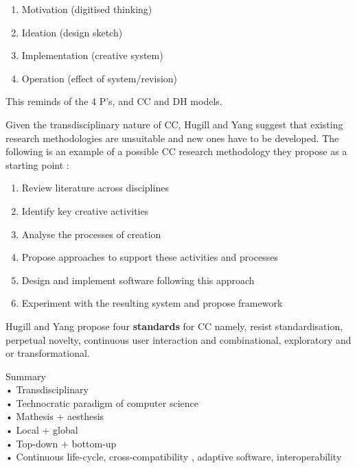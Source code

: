 \begin{enumerate}
  \item Motivation (digitised thinking)
  \item Ideation (design sketch)
  \item Implementation (creative system)
  \item Operation (effect of system/revision)
\end{enumerate}

\begin{draft}
  This reminds of the 4 P’s, and CC and DH models.
\end{draft}

Given the transdisciplinary nature of CC, Hugill and Yang suggest that existing research methodologies are unsuitable and new ones have to be developed. The following is an example of a possible CC research methodology they propose as a starting point \citep[p.17]{Hugill2013c}:

\begin{enumerate}
  \item Review literature across disciplines
  \item Identify key creative activities
  \item Analyse the processes of creation
  \item Propose approaches to support these activities and processes
  \item Design and implement software following this approach
  \item Experiment with the resulting system and propose framework
\end{enumerate}

Hugill and Yang propose four \textbf{standards} for CC \citep[p.17]{Hugill2013c} namely, resist standardisation, perpetual novelty, continuous user interaction and combinational, exploratory and or transformational.

\begin{shaded}
  Summary\\
  •	Transdisciplinary\\
  •	Technocratic paradigm of computer science\\
  •	Mathesis + aesthesis\\
  •	Local + global\\
  •	Top-down + bottom-up\\
  •	Continuous life-cycle, cross-compatibility , adaptive software, interoperability
\end{shaded}

